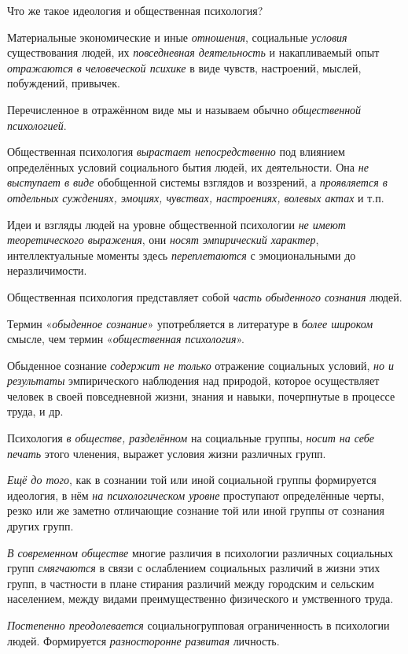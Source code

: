 \documentclass[a4paper,14pt,russian]{extreport}
\begin{document}
Что же такое идеология и общественная психология?

Материальные экономические и иные \emph{отношения}, социальные \emph{условия} существования людей, их \emph{повседневная деятельность} и накапливаемый опыт \emph{отражаются в человеческой психике} в виде чувств, настроений, мыслей, побуждений, привычек.

Перечисленное в отражённом виде мы и называем обычно \emph{общественной психологией}.

Общественная психология \emph{вырастает непосредственно} под влиянием определённых условий социального бытия людей, их деятельности. Она \emph{не выступает в виде} обобщенной системы взглядов и воззрений, а \emph{проявляется в отдельных суждениях, эмоциях, чувствах, настроениях, волевых актах} и т.п.

Идеи и взгляды людей на уровне общественной психологии \emph{не имеют теоретического выражения}, они \emph{носят эмпирический характер}, интеллектуальные моменты здесь \emph{переплетаются} с эмоциональными до неразличимости.

Общественная психология представляет собой \emph{часть обыденного сознания} людей.

Термин «\emph{обыденное сознание}» употребляется в литературе в \emph{более широком} смысле, чем термин «\emph{общественная психология}».

Обыденное сознание \emph{содержит не только} отражение социальных условий, \emph{но и результаты} эмпирического наблюдения над природой, которое осуществляет человек в своей повседневной жизни, знания и навыки\textsc{,} почерпнутые в процессе труда, и др.

Психология \emph{в обществе, разделённом} на социальные группы, \emph{носит на себе печать} этого членения, выражет условия жизни различных групп.

\emph{Ещё до того}, как в сознании той или иной социальной группы формируется идеология, в нём \emph{на психологическом уровне} проступают определённые черты, резко или же заметно отличающие сознание той или иной группы от сознания других групп.

\emph{В современном обществе} многие различия в психологии различных социальных групп \emph{смягчаются} в связи с ослаблением социальных различий в жизни этих групп, в частности в плане стирания различий между городским и сельским населением, между видами преимущественно физического и умственного труда.

\emph{Постепенно преодолевается} социальногрупповая ограниченность в психологии людей. Формируется \emph{разносторонне развитая} личность.
\end{document}
